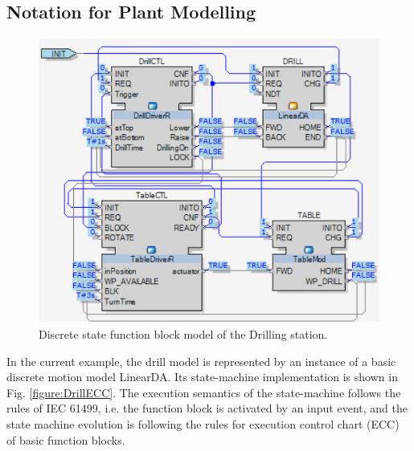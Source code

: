 \documentclass[conference]{IEEEtran}
\begin{document}
\subsection{Notation for Plant Modelling}


\begin{figure}
    \centering
    \includegraphics[scale = 0.65]{images/VerificationFB.png}
    \caption{Discrete state function block model of the Drilling station. }
    \label{figure:FBver}
\end{figure}

In the current example, the drill model is represented by an instance of a basic discrete motion model LinearDA. 
Its state-machine implementation is shown in Fig. \ref{figure:DrillECC}. The execution semantics of the state-machine follows the rules of IEC 61499, i.e. the function block is activated by an input event, and the state machine evolution is following the rules for execution control chart (ECC) of basic function blocks. 
\end{document}
